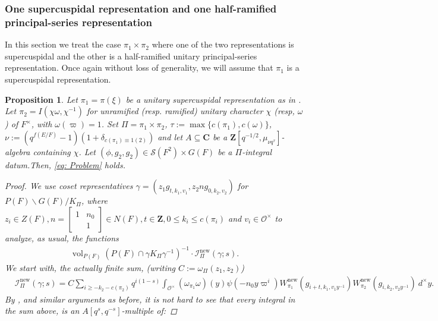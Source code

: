 \documentclass{amsart}
\theoremstyle{plain}
\newtheorem{prop}[thm]{Proposition}
\theoremstyle{plain}
\theoremstyle{remark}
\DeclareMathOperator{\vol}{vol}
\begin{document}
\subsubsection{One supercuspidal representation and one half-ramified principal-series representation}
In this section we treat the case $\pi_1\times \pi_2$ where one of the two representations is supercuspidal and the other is a half-ramified unitary principal-series representation. Once again without loss of generality, we will assume that $\pi_1$ is a supercuspidal representation.
\begin{prop}\label{thm sup + half-ram p-s}
    Let $\pi_1=\pi(\xi)$ be a unitary supercuspidal representation as in \emph{}. Let $\pi_2=I(\chi \omega,\chi^{-1})$ for unramified (resp. ramified) unitary character $\chi$ (resp, $\omega$) of $F^\times$, with $\omega(\varpi)=1$. Set $\Pi=\pi_1\times \pi_2$, $\tau:=\max\{c(\pi_1),c(\omega)\}$, $\nu:=(q^{f(E/F)}-1)(1+\delta_{c(\pi_1)\equiv 1(2)})$ and let $A\subseteq \mathbf{C}$ be a $\mathbf{Z}[q^{-1/2},\mu_{\nu q^\tau}]$-algebra containing $\chi$. Let $(\phi,g_2,g_2)\in \mathcal{S}(F^2)\times G(F)$ be a $\Pi$-integral datum.Then, \eqref{eq: Problem} holds.
    \begin{proof}
        We use coset representatives $\gamma=(z_1g_{t,k_1,v_1},z_2ng_{0,k_2,v_2})$ for $P(F)\backslash G(F)/K_\Pi$, where $z_i\in Z(F),n=\left[\begin{smallmatrix}
            1 & n_0\\
            & 1
        \end{smallmatrix}\right]\in N(F),t\in\mathbf{Z}, 0\leq k_i\leq c(\pi_i)$ and $v_i\in\mathcal{O}^\times$ to analyze, as usual, the functions
        \begin{align}\label{eq: 38}
            \vol_{P(F)}\left(P(F)\cap \gamma K_\Pi \gamma^{-1}\right)^{-1}\cdot \mathcal{I}_{\Pi}^\mathrm{new}(\gamma;s).
        \end{align}
        We start with, the actually finite sum, (writing $C:=\omega_{\Pi}(z_1,z_2)$)
        \begin{align}\label{eq: 39}
            &{\mathcal{I}_{\Pi}^\mathrm{new}(\gamma;s)=C\sum_{i\geq -k_2-c(\pi_2)}q^{i(1-s)}\int_{\mathcal{O}^\times}(\omega_{\pi_1}\omega)(y)\psi(-n_0y\varpi^i)W_{\pi_1}^\mathrm{new}(g_{i+t,k_1,v_1y^{-1}})W_{\pi_2}^\mathrm{new}(g_{i,k_2,v_2y^{-1}})\ d^\times y}.
        \end{align}
        By , and similar arguments as before, it is not hard to see that every integral in the sum above, is an $A[q^s,q^{-s}]$-multiple of:

\end{proof}
\end{prop}
\end{document}
